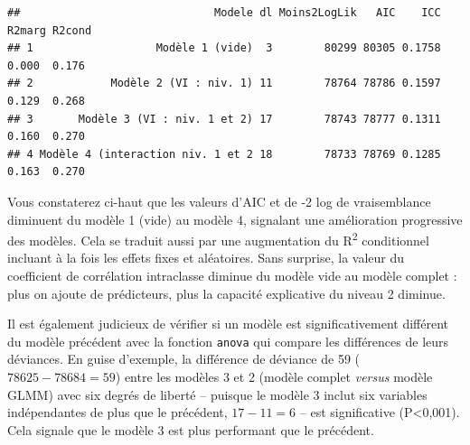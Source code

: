 \documentclass[
  11pt,
  french,
]{book}
\makeatletter
\newenvironment{Shaded}{\begin{snugshade}}{\end{snugshade}}
\newcommand{\DataTypeTok}[1]{\textcolor[rgb]{0.13,0.29,0.53}{#1}}
\newcommand{\DecValTok}[1]{\textcolor[rgb]{0.00,0.00,0.81}{#1}}
\newcommand{\KeywordTok}[1]{\textcolor[rgb]{0.13,0.29,0.53}{\textbf{#1}}}
\newcommand{\NormalTok}[1]{#1}
\newcommand{\OperatorTok}[1]{\textcolor[rgb]{0.81,0.36,0.00}{\textbf{#1}}}
\newcommand{\StringTok}[1]{\textcolor[rgb]{0.31,0.60,0.02}{#1}}
\newenvironment{kframe}{%
\medskip{}
\setlength{\fboxsep}{.8em}
 \def\at@end@of@kframe{}%
 \ifinner\ifhmode%
  \def\at@end@of@kframe{\end{minipage}}%
  \begin{minipage}{\columnwidth}%
 \fi\fi%
 \def\FrameCommand##1{\hskip\@totalleftmargin \hskip-\fboxsep
 \colorbox{shadecolor}{##1}\hskip-\fboxsep
     \hskip-\linewidth \hskip-\@totalleftmargin \hskip\columnwidth}%
 \MakeFramed {\advance\hsize-\width
   \@totalleftmargin\z@ \linewidth\hsize
   \@setminipage}}%
 {\par\unskip\endMakeFramed%
 \at@end@of@kframe}
\renewenvironment{Shaded}{\begin{kframe}}{\end{kframe}}
\makeatother
\begin{document}
\begin{Shaded}
\end{Shaded}

\begin{verbatim}
##                              Modele dl Moins2LogLik   AIC    ICC R2marg R2cond
## 1                   Modèle 1 (vide)  3        80299 80305 0.1758  0.000  0.176
## 2            Modèle 2 (VI : niv. 1) 11        78764 78786 0.1597  0.129  0.268
## 3       Modèle 3 (VI : niv. 1 et 2) 17        78743 78777 0.1311  0.160  0.270
## 4 Modèle 4 (interaction niv. 1 et 2 18        78733 78769 0.1285  0.163  0.270
\end{verbatim}

Vous constaterez ci-haut que les valeurs d'AIC et de -2 log de vraisemblance diminuent du modèle 1 (vide) au modèle 4, signalant une amélioration progressive des modèles. Cela se traduit aussi par une augmentation du R\textsuperscript{2} conditionnel incluant à la fois les effets fixes et aléatoires. Sans surprise, la valeur du coefficient de corrélation intraclasse diminue du modèle vide au modèle complet : plus on ajoute de prédicteurs, plus la capacité explicative du niveau 2 diminue.

Il est également judicieux de vérifier si un modèle est significativement différent du modèle précédent avec la fonction \texttt{anova} qui compare les différences de leurs déviances. En guise d'exemple, la différence de déviance de 59 (\(78625-78684=59\)) entre les modèles 3 et 2 (modèle complet \emph{versus} modèle GLMM) avec six degrés de liberté -- puisque le modèle 3 inclut six variables indépendantes de plus que le précédent, \(17-11=6\) -- est significative (P\textless0,001). Cela signale que le modèle 3 est plus performant que le précédent.
\end{document}
